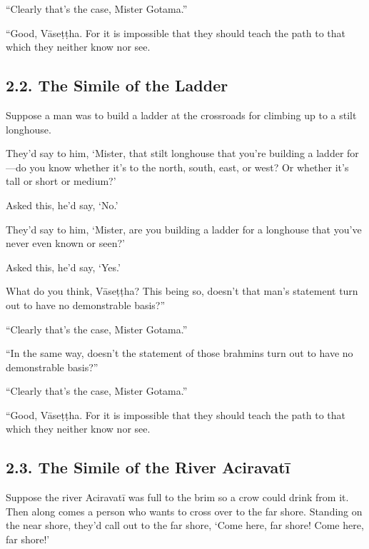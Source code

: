 \documentclass[12pt,openany]{book}%
\begin{document}
“Clearly that’s the case, Mister Gotama.” 

“Good, \textsanskrit{Vāseṭṭha}. For it is impossible that they should teach the path to that which they neither know nor see. 

\subsection*{2.2. The Simile of the Ladder }

Suppose a man was to build a ladder at the crossroads for climbing up to a stilt longhouse. 

They’d say to him, ‘Mister, that stilt longhouse that you’re building a ladder for—do you know whether it’s to the north, south, east, or west? Or whether it’s tall or short or medium?’ 

Asked this, he’d say, ‘No.’ 

They’d say to him, ‘Mister, are you building a ladder for a longhouse that you’ve never even known or seen?’ 

Asked this, he’d say, ‘Yes.’ 

What do you think, \textsanskrit{Vāseṭṭha}? This being so, doesn’t that man’s statement turn out to have no demonstrable basis?” 

“Clearly that’s the case, Mister Gotama.” 

“In the same way, doesn’t the statement of those brahmins turn out to have no demonstrable basis?” 

“Clearly that’s the case, Mister Gotama.” 

“Good, \textsanskrit{Vāseṭṭha}. For it is impossible that they should teach the path to that which they neither know nor see. 

\subsection*{2.3. The Simile of the River \textsanskrit{Aciravatī} }

Suppose the river \textsanskrit{Aciravatī} was full to the brim so a crow could drink from it. Then along comes a person who wants to cross over to the far shore. Standing on the near shore, they’d call out to the far shore, ‘Come here, far shore! Come here, far shore!’ 
\end{document}
